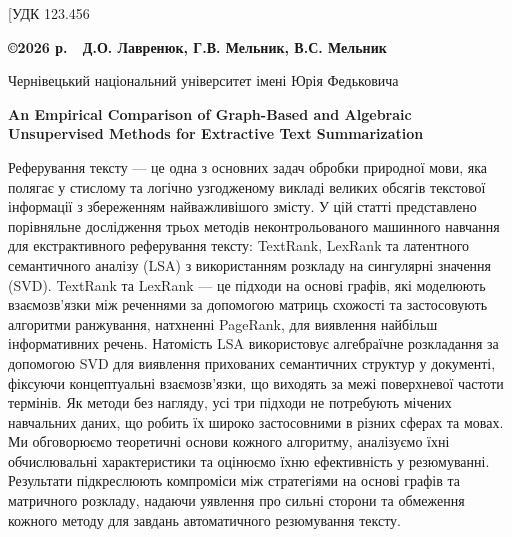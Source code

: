 \documentclass[10pt]{book}
\begin{document}
\setcounter{equation}{0}
\large
\twocolumn[УДК 123.456
\begin{center}
{\Large \bf \copyright 2026 р. \,\, Д.О. Лавренюк, Г.В. Мельник, В.С. Мельник\/}
\bigskip

Чернівецький національний університет імені Юрія Федьковича
\end{center}

\begin{center}
{\bf An Empirical Comparison of Graph-Based and Algebraic Unsupervised Methods for Extractive Text Summarization\/}
\end{center}

\begin{center}
\parbox{15cm}{\normalsize \parindent=0.5cm
Реферування тексту — це одна з основних задач обробки природної мови, яка полягає у стислому та логічно 
узгодженому викладі великих обсягів текстової інформації з збереженням найважливішого змісту. У цій статті 
представлено порівняльне дослідження трьох методів неконтрольованого машинного навчання для екстрактивного 
реферування тексту: TextRank, LexRank та латентного семантичного аналізу (LSA) з використанням розкладу 
на сингулярні значення (SVD). TextRank та LexRank — це підходи на основі графів, які моделюють 
взаємозв’язки між реченнями за допомогою матриць схожості та застосовують алгоритми ранжування, 
натхненні PageRank, для виявлення найбільш інформативних речень. Натомість LSA використовує 
алгебраїчне розкладання за допомогою SVD для виявлення прихованих семантичних структур у документі, 
фіксуючи концептуальні взаємозв’язки, що виходять за межі поверхневої частоти термінів. Як методи 
без нагляду, усі три підходи не потребують мічених навчальних даних, що робить їх широко 
застосовними в різних сферах та мовах. Ми обговорюємо теоретичні основи кожного алгоритму, 
аналізуємо їхні обчислювальні характеристики та оцінюємо їхню ефективність у резюмуванні. 
Результати підкреслюють компроміси між стратегіями на основі графів та матричного розкладу, 
надаючи уявлення про сильні сторони та обмеження кожного методу для завдань автоматичного 
резюмування тексту.


\bigskip

}
\end{center}
\end{document}
